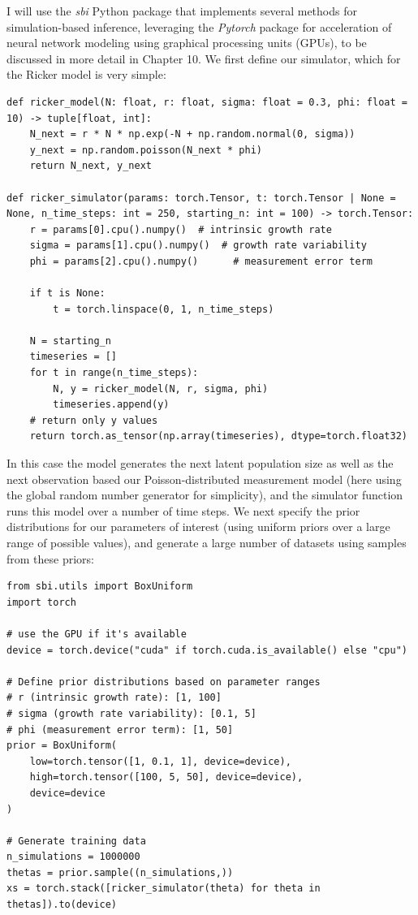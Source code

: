 I will use the \textit{sbi} Python package that implements several methods for simulation-based inference, leveraging the \textit{Pytorch} package for  acceleration of neural network modeling using graphical processing units (GPUs), to be discussed in more detail in Chapter 10. We first define our simulator, which for the Ricker model is very simple:

\begin{lstlisting}[style=Python]
def ricker_model(N: float, r: float, sigma: float = 0.3, phi: float = 10) -> tuple[float, int]:
    N_next = r * N * np.exp(-N + np.random.normal(0, sigma))
    y_next = np.random.poisson(N_next * phi)
    return N_next, y_next

def ricker_simulator(params: torch.Tensor, t: torch.Tensor | None = None, n_time_steps: int = 250, starting_n: int = 100) -> torch.Tensor:
    r = params[0].cpu().numpy()  # intrinsic growth rate
    sigma = params[1].cpu().numpy()  # growth rate variability
    phi = params[2].cpu().numpy()      # measurement error term
    
    if t is None:
        t = torch.linspace(0, 1, n_time_steps)

    N = starting_n 
    timeseries = []
    for t in range(n_time_steps):
        N, y = ricker_model(N, r, sigma, phi)
        timeseries.append(y)
    # return only y values
    return torch.as_tensor(np.array(timeseries), dtype=torch.float32)
\end{lstlisting}

In this case the model generates the next latent population size as well as the next observation based our Poisson-distributed measurement model (here using the global random number generator for simplicity), and the simulator function runs this model over a number of time steps.  We next specify the prior distributions for our parameters of interest (using uniform priors over a large range of possible values), and generate a large number of datasets using samples from these priors:

\begin{lstlisting}[style=Python]
from sbi.utils import BoxUniform
import torch 

# use the GPU if it's available
device = torch.device("cuda" if torch.cuda.is_available() else "cpu")

# Define prior distributions based on parameter ranges
# r (intrinsic growth rate): [1, 100]
# sigma (growth rate variability): [0.1, 5]
# phi (measurement error term): [1, 50]
prior = BoxUniform(
    low=torch.tensor([1, 0.1, 1], device=device),
    high=torch.tensor([100, 5, 50], device=device),
    device=device
)

# Generate training data
n_simulations = 1000000
thetas = prior.sample((n_simulations,))
xs = torch.stack([ricker_simulator(theta) for theta in thetas]).to(device)
\end{lstlisting}

